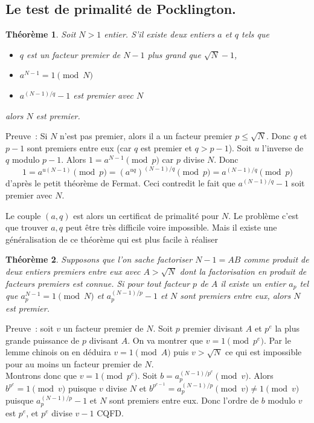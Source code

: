 \documentclass[a4paper,11pt]{article}
\newtheorem{thm}{Théorème}
\begin{document}
\subsection{Le test de primalit\'e de Pocklington.} 
\begin{thm}
Soit $N>1$ entier. S'il existe deux entiers $a$ et $q$ tels que
\begin{itemize}
\item $q$ est un facteur premier de $N-1$ plus grand que $\sqrt{N}-1$,
\item $a^{N-1}=1 \pmod N$
\item $a^{(N-1)/q}-1$ est premier avec $N$
\end{itemize}
alors $N$ est premier.
\end{thm}
Preuve~: Si $N$ n'est pas premier, alors il a un facteur premier
$p\leq \sqrt{N}$. Donc $q$ et $p-1$ sont premiers entre eux
(car $q$ est premier et $q>p-1$). Soit $u$ l'inverse de $q$ modulo
$p-1$. Alors $1=a^{N-1} \pmod p$ car $p$ divise $N$. Donc
$$ 1=a^{u(N-1)} \pmod p = \left(a^{uq}\right)^{(N-1)/q} \pmod p =
a^{(N-1)/q} \pmod p$$
d'apr\`es le petit th\'eor\`eme de Fermat. Ceci contredit 
le fait que $a^{(N-1)/q}-1$ soit premier avec $N$.

Le couple $(a,q)$ est alors un certificat de primalit\'e pour $N$.
Le probl\`eme c'est que trouver $a,q$ peut \^etre tr\`es difficile
voire impossible. Mais il existe une g\'en\'eralisation de ce
th\'eor\`eme qui est plus facile \`a r\'ealiser
\begin{thm}
Supposons que l'on sache factoriser $N-1=AB$ comme produit de deux entiers
premiers entre eux avec $A>\sqrt{N}$ dont la factorisation en produit
de facteurs premiers est connue. Si pour tout facteur $p$ de $A$ il
existe un entier $a_p$ tel que $a_p^{N-1}=1 \pmod N$ et
$a_p^{(N-1)/p}-1$ et $N$ sont premiers entre eux, alors $N$ est premier.
\end{thm}
Preuve~: soit $v$ un facteur premier de $N$. 
Soit $p$ premier divisant $A$ et $p^e$ la plus grande
puissance de $p$ divisant $A$. On va montrer que $v=1 \pmod{p^e}$.
Par le lemme chinois on en d\'eduira $v=1 \pmod A$ puis $v>\sqrt{N}$
ce qui est impossible pour au moins un facteur premier de $N$.\\
Montrons donc que $v=1 \pmod{p^e}$. Soit $b=a_p^{(N-1)/p^e} \pmod v$. Alors $b^{p^e}=1 \pmod v$
puisque $v$ divise $N$ et $b^{p^{e-1}} = a_p^{(N-1)/p} \pmod v \neq 1
\pmod v$ puisque $a_p^{(N-1)/p}-1$ et $N$ sont premiers entre eux.
Donc l'ordre de $b$ modulo $v$ est $p^e$, et $p^e$ divise $v-1$ CQFD.
\end{document}
